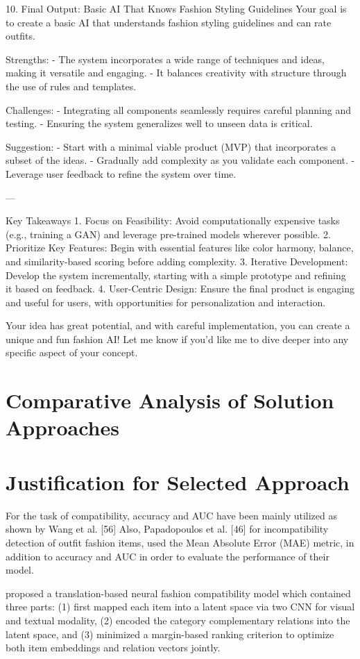 10. Final Output: Basic AI That Knows Fashion Styling Guidelines
Your goal is to create a basic AI that understands fashion styling guidelines and can rate outfits.

Strengths:
- The system incorporates a wide range of techniques and ideas, making it versatile and engaging.
- It balances creativity with structure through the use of rules and templates.

Challenges:
- Integrating all components seamlessly requires careful planning and testing.
- Ensuring the system generalizes well to unseen data is critical.

Suggestion:
- Start with a minimal viable product (MVP) that incorporates a subset of the ideas.
- Gradually add complexity as you validate each component.
- Leverage user feedback to refine the system over time.

---

Key Takeaways
1. Focus on Feasibility: Avoid computationally expensive tasks (e.g., training a GAN) and leverage pre-trained models wherever possible.
2. Prioritize Key Features: Begin with essential features like color harmony, balance, and similarity-based scoring before adding complexity.
3. Iterative Development: Develop the system incrementally, starting with a simple prototype and refining it based on feedback.
4. User-Centric Design: Ensure the final product is engaging and useful for users, with opportunities for personalization and interaction.

Your idea has great potential, and with careful implementation, you can create a unique and fun fashion AI! Let me know if you'd like me to dive deeper into any specific aspect of your concept.


\section{Comparative Analysis of Solution Approaches}
\section{Justification for Selected Approach}


For the task of compatibility,
accuracy and AUC have been mainly utilized as shown by Wang et al. [56] Also,
Papadopoulos et al. [46] for incompatibility detection of outfit fashion items, used
the Mean Absolute Error (MAE) metric, in addition to accuracy and AUC in order
to evaluate the performance of their model.


proposed a translation-based neural fashion compatibility
model which contained three parts: (1) first mapped each item into a latent space via two CNN for
visual and textual modality, (2) encoded the category complementary relations into the latent space,
and (3) minimized a margin-based ranking criterion to optimize both item embeddings and relation
vectors jointly.